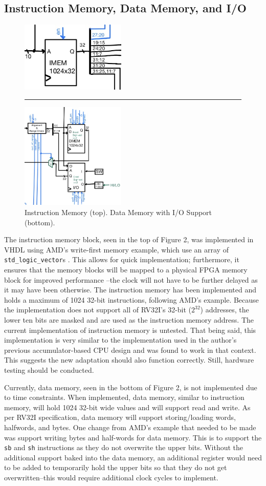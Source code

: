\documentclass[lettersize,journal]{IEEEtran}
\begin{document}
\subsection{Instruction Memory,  Data Memory, and I/O}
\begin{figure}[!h]
    \label{fig:memory}
    \centering
    \includegraphics[width=5cm]{IMEM.jpg}
    \rule{7cm}{0.8pt}
    \includegraphics[width=5cm]{DMEM-IO.jpg}
    \caption{Instruction Memory (top). Data Memory with I/O Support (bottom).}
\end{figure}
The instruction memory block, seen in the top of Figure 2, was implemented in VHDL using AMD's write-first memory example, which use an array of \verb|std_logic_vector|s \cite{amdblockram}.
This allows for quick implementation; furthermore, it ensures that the memory blocks will be mapped to a physical FPGA memory block for improved performance
--the clock will not have to be further delayed as it may have been otherwise.
The instruction memory has been implemented and holds a maximum of 1024 32-bit instructions, following AMD's example.
Because the implementation does not support all of RV32I's 32-bit ($2^{32}$) addresses, the lower ten bits are masked and are used as the instruction memory address.
The current implementation of instruction memory is untested.
That being said, this implementation is very similar to the implementation used in the author's previous accumulator-based CPU design and was found to work in that context.
This suggests the new adaptation should also function correctly.
Still, hardware testing should be conducted.

Currently, data memory, seen in the bottom of Figure 2, is not implemented due to time constraints.
When implemented, data memory, similar to instruction memory, will hold 1024 32-bit wide values and will support read and write.
As per RV32I specification, data memory will support storing/loading words, halfwords, and bytes.
One change from AMD's example that needed to be made was support writing bytes and half-words for data memory.
This is to support the \verb|sb| and \verb|sh| instructions as they do not overwrite the upper bits.
Without the additional support baked into the data memory,
an additional register would need to be added to temporarily hold the upper bits so that they do not get overwritten--this would require additional clock cycles to implement.
\end{document}
